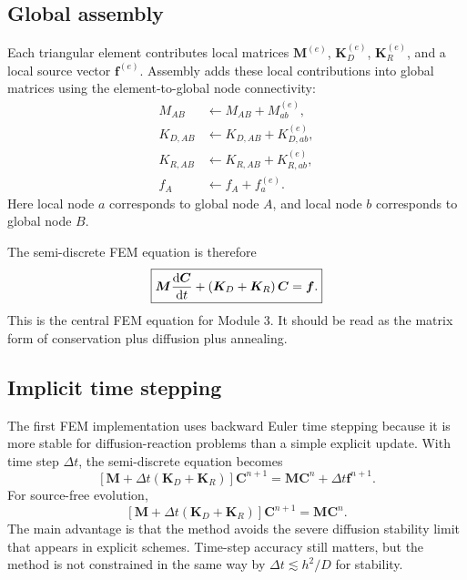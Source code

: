 \documentclass[11pt]{article}
\begin{document}
\subsection{Global assembly}

Each triangular element contributes local matrices $\bm{M}^{(e)}$, $\bm{K}_{D}^{(e)}$, $\bm{K}_{R}^{(e)}$, and a local source vector $\bm{f}^{(e)}$. Assembly adds these local contributions into global matrices using the element-to-global node connectivity:
\begin{align}
M_{AB} &\leftarrow M_{AB}+M_{ab}^{(e)},\\
K_{D,AB} &\leftarrow K_{D,AB}+K_{D,ab}^{(e)},\\
K_{R,AB} &\leftarrow K_{R,AB}+K_{R,ab}^{(e)},\\
f_A &\leftarrow f_A+f_a^{(e)}.
\end{align}
Here local node $a$ corresponds to global node $A$, and local node $b$ corresponds to global node $B$.

The semi-discrete FEM equation is therefore
\begin{equation}
\boxed{
\bm{M}\dv{\bm{C}}{t}+\left(\bm{K}_D+\bm{K}_R\right)\bm{C}=\bm{f}.
}
\end{equation}
This is the central FEM equation for Module 3. It should be read as the matrix form of conservation plus diffusion plus annealing.

\subsection{Implicit time stepping}

The first FEM implementation uses backward Euler time stepping because it is more stable for diffusion-reaction problems than a simple explicit update. With time step $\Delta t$, the semi-discrete equation becomes
\begin{equation}
\left[\bm{M}+\Delta t\left(\bm{K}_D+\bm{K}_R\right)\right]\bm{C}^{n+1}
=
\bm{M}\bm{C}^{n}+\Delta t\bm{f}^{n+1}.
\end{equation}
For source-free evolution,
\begin{equation}
\left[\bm{M}+\Delta t\left(\bm{K}_D+\bm{K}_R\right)\right]\bm{C}^{n+1}
=
\bm{M}\bm{C}^{n}.
\end{equation}
The main advantage is that the method avoids the severe diffusion stability limit that appears in explicit schemes. Time-step accuracy still matters, but the method is not constrained in the same way by $\Delta t \lesssim h^2/D$ for stability.
\end{document}
